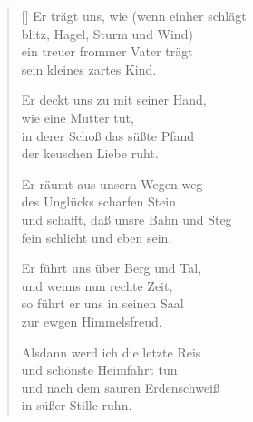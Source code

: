 \begin{multicols}{2}
\begin{verse}[\versewidth]
 Er trägt uns, wie (wenn einher schlägt\\
blitz, Hagel, Sturm und Wind)\\
ein treuer frommer Vater trägt\\
sein kleines zartes Kind.

 Er deckt uns zu mit seiner Hand,\\
wie eine Mutter tut,\\
in derer Schoß das süßte Pfand\\
der keuschen Liebe ruht.

 Er räumt aus unsern Wegen weg\\
des Unglücks scharfen Stein\\
und schafft, daß unsre Bahn und Steg\\
fein schlicht und eben sein.

 Er führt uns über Berg und Tal,\\
und wenns nun rechte Zeit,\\
so führt er uns in seinen Saal\\
zur ewgen Himmelsfreud.

 Alsdann werd ich die letzte Reis\\
und schönste Heimfahrt tun\\
und nach dem sauren Erdenschweiß\\
in süßer Stille ruhn.

\end{verse}
\end{multicols}
